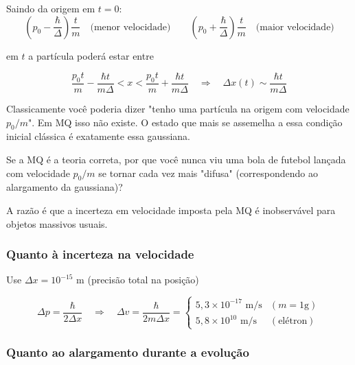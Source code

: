
Saindo da origem em $t=0$:
\begin{equation}
    \left(p_0 - \frac{\hbar}{\Delta}\right)\frac{t}{m} \quad \text{(menor velocidade)} \qquad \left(p_0 + \frac{\hbar}{\Delta}\right)\frac{t}{m} \quad \text{(maior velocidade)}
\label{eq:aula14_velocidades_extremas}
\end{equation}

em $t$ a partícula poderá estar entre

\begin{equation}
    \frac{p_0 t}{m} - \frac{\hbar t}{m\Delta} < x < \frac{p_0 t}{m} + \frac{\hbar t}{m\Delta} \quad \Longrightarrow \quad \Delta x(t) \sim \frac{\hbar t}{m\Delta}
\label{eq:aula14_intervalo_x_t}
\end{equation}

Classicamente você poderia dizer "tenho uma partícula na origem com velocidade $p_0/m$". Em MQ isso não existe. O estado que mais se assemelha a essa condição inicial clássica é exatamente essa gaussiana.

Se a MQ é a teoria correta, por que você nunca viu uma bola de futebol lançada com velocidade $p_0/m$ se tornar cada vez mais "difusa" (correspondendo ao alargamento da gaussiana)?

A razão é que a incerteza em velocidade imposta pela MQ é inobservável para objetos massivos usuais.

\subsubsection*{Quanto à incerteza na velocidade}

Use $\Delta x = 10^{-15}$ m (precisão total na posição)

\begin{equation}
    \Delta p = \frac{\hbar}{2\Delta x} \quad \Longrightarrow \quad \Delta v = \frac{\hbar}{2m\Delta x} =
    \begin{cases}
        5{,}3 \times 10^{-17} \text{ m/s} & (m = 1\text{g}) \\
        5{,}8 \times 10^{10} \text{ m/s} & (\text{elétron})
    \end{cases}
\label{eq:aula14_incerteza_velocidade}
\end{equation}

\subsubsection*{Quanto ao alargamento durante a evolução}

